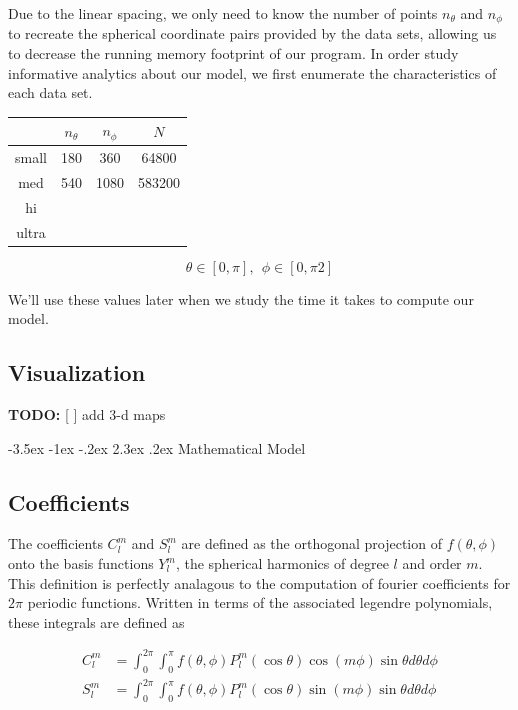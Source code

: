 \documentclass[a4paper]{article}
\makeatletter
\renewcommand\section{\@startsection{section}{1}{\z@}%
                                  {-3.5ex \@plus -1ex \@minus -.2ex}%
                                  {2.3ex \@plus.2ex}%
                                  {\normalfont\normalsize\bfseries}}
\theoremstyle{definition}
\makeatother
\begin{document}
Due to the linear spacing, we only need to know the number of points $n_\theta$ and $n_\phi$ to recreate the spherical coordinate pairs provided 
by the data sets, allowing us to decrease the running memory footprint of our program. In order study informative analytics about our model, we first enumerate
the characteristics of each data set.

    \begin{center}
    \begin{tabular}{ c |  c  c  c }
        & $n_\theta$ & $n_\phi$ & $N$ \\ 
    \hline
    small & 180 & 360 & 64800\\
    med & 540 & 1080 & 583200\\
    hi \\
    ultra
    \end{tabular}
    \end{center}
$$\theta \in [0, \pi],\ \ \phi \in [0, \pi2]$$

We'll use these values later when we study the time it takes to compute our model.

\subsection{Visualization}

\textbf{TODO:} [ ] add 3-d maps

\section{Mathematical Model}




\subsection{Coefficients}

The coefficients $C_l^m$ and $S_l^m$ are defined as the orthogonal projection of $f(\theta, \phi)$ onto the basis functions $Y_l^m$, the spherical harmonics of degree $l$ and order $m$. This definition is perfectly analagous to the 
computation of fourier coefficients for $2\pi$ periodic functions. Written in terms of the associated legendre polynomials, these integrals are defined as

\begin{align*}
    \label{eq:coeff}
    C_l^m &= \int_0^{2\pi}\int_0^\pi f(\theta, \phi) P_l^m (\cos \theta)\cos (m \phi) \sin \theta d\theta d\phi\\
    S_l^m &= \int_0^{2\pi}\int_0^\pi f(\theta, \phi) P_l^m (\cos \theta)\sin (m \phi) \sin \theta d\theta d\phi 
\end{align*}
\end{document}
